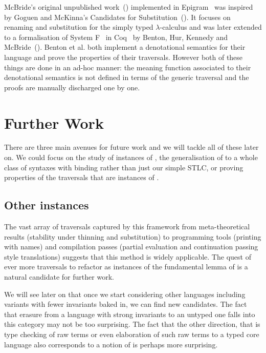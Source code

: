 McBride's original unpublished work~(\citeyear{mcbride2005type}) implemented
in Epigram~\cite{mcbride2004view} was inspired by Goguen and McKinna's
Candidates for Substitution~(\citeyear{goguen1997candidates}). It focuses on
renaming and substitution for the simply typed $λ$-calculus and was later
extended to a formalisation of System F~\cite{girard1972interpretation}
in Coq~\cite{Coq:manual} by Benton, Hur, Kennedy and McBride~(\citeyear{benton2012strongly}).
Benton et al. both implement a denotational semantics for their language
and prove the properties of their traversals. However both of these things
are done in an ad-hoc manner: the meaning function associated to their
denotational semantics is not defined in terms of the generic traversal
and the proofs are manually discharged one by one.

\section{Further Work}

There are three main avenues for future work and we will tackle all of these later on.
We could focus on the study of instances of , the generalisation of
 to a whole class of syntaxes with binding rather than just our simple
STLC, or proving properties of the traversals that are instances of .

\subsection{Other instances}

The vast array of traversals captured by this framework from meta-theoretical
results (stability under thinning and substitution) to programming tools
(printing with names) and compilation passes (partial evaluation and
continuation passing style translations) suggests that this method is widely
applicable. The quest of ever more traversals to refactor as instances of the
fundamental lemma of  is a natural candidate for further work.

We will see later on that once we start considering other languages including
variants with fewer invariants baked in, we can find new candidates. The fact
that erasure from a language with strong invariants to an untyped one falls
into this category may not be too surprising. The fact that the other direction,
that is type checking of raw terms or even elaboration of such raw terms to a
typed core language also corresponds to a notion of  is perhaps
more surprising.

